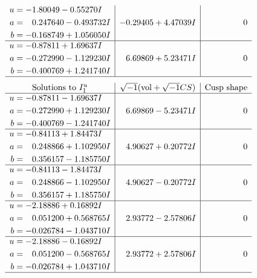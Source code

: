 \documentclass[1p]{elsarticle_modified}
\theoremstyle{definition}
\newcommand{\I}{\sqrt{-1}}
\begin{document}
$$\begin{array}{c|c|c}
\begin{aligned}
u &= -1.80049 - 0.55270 I \\
a &= \phantom{-}0.247640 - 0.493732 I \\
b &= -0.168749 + 1.056050 I\end{aligned}
 & -0.29405 + 4.47039 I & \phantom{-0.000000 } 0 \\ \hline\begin{aligned}
u &= -0.87811 + 1.69637 I \\
a &= -0.272990 - 1.129230 I \\
b &= -0.400769 + 1.241740 I\end{aligned}
 & \phantom{-}6.69869 + 5.23471 I & \phantom{-0.000000 } 0\\
 \hline 
 \end{array}$$\newpage$$\begin{array}{c|c|c}  
\text{Solutions to }I^u_{1}& \I (\text{vol} + \sqrt{-1}CS) & \text{Cusp shape}\\
 \hline 
\begin{aligned}
u &= -0.87811 - 1.69637 I \\
a &= -0.272990 + 1.129230 I \\
b &= -0.400769 - 1.241740 I\end{aligned}
 & \phantom{-}6.69869 - 5.23471 I & \phantom{-0.000000 } 0 \\ \hline\begin{aligned}
u &= -0.84113 + 1.84473 I \\
a &= \phantom{-}0.248866 + 1.102950 I \\
b &= \phantom{-}0.356157 - 1.185750 I\end{aligned}
 & \phantom{-}4.90627 + 0.20772 I & \phantom{-0.000000 } 0 \\ \hline\begin{aligned}
u &= -0.84113 - 1.84473 I \\
a &= \phantom{-}0.248866 - 1.102950 I \\
b &= \phantom{-}0.356157 + 1.185750 I\end{aligned}
 & \phantom{-}4.90627 - 0.20772 I & \phantom{-0.000000 } 0 \\ \hline\begin{aligned}
u &= -2.18886 + 0.16892 I \\
a &= \phantom{-}0.051200 + 0.568765 I \\
b &= -0.026784 - 1.043710 I\end{aligned}
 & \phantom{-}2.93772 - 2.57806 I & \phantom{-0.000000 } 0 \\ \hline\begin{aligned}
u &= -2.18886 - 0.16892 I \\
a &= \phantom{-}0.051200 - 0.568765 I \\
b &= -0.026784 + 1.043710 I\end{aligned}
 & \phantom{-}2.93772 + 2.57806 I & \phantom{-0.000000 } 0\\
 \hline 
 \end{array}$$\newpage\newpage\renewcommand{\arraystretch}{1}
\end{document}
